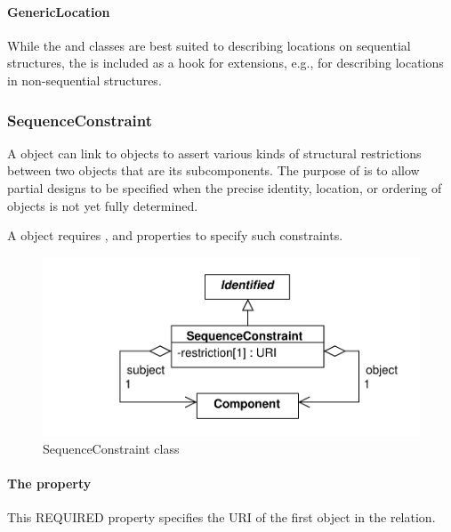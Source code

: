 \paragraph{GenericLocation}
\label{sec:GenericLocation}

While the  and  classes are best suited to
describing locations on sequential structures, the
 is included as a hook for extensions, e.g., for
describing locations in non-sequential structures.


\subsubsection{SequenceConstraint}
\label{sec:SequenceConstraint}
A  object can link to  objects to assert various kinds of structural restrictions between two  objects that are its subcomponents. 
The purpose of  is to allow partial designs to be specified when the precise identity, location, or ordering of  objects is not yet fully determined.

A  object requires ,  and  properties to specify such constraints.

\begin{figure}[ht]
\begin{center}
\includegraphics[scale=0.6]{uml/sequence_constraint}
\caption[]{SequenceConstraint class}
\label{uml:sequence_constraint}
\end{center}
\end{figure}

\paragraph{The  property}
\label{sec:subject}
This REQUIRED property specifies the URI  of the first  object in the relation.

